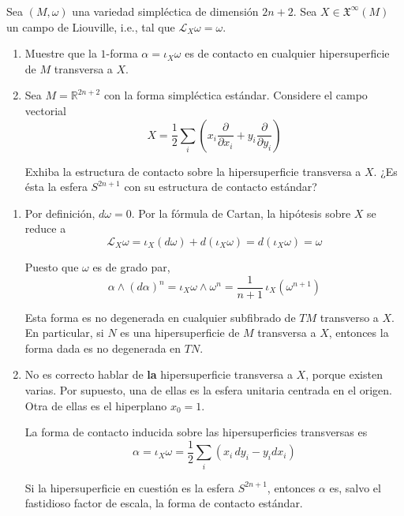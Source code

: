 \begin{problem}
Sea $(M, \omega)$ una variedad simpléctica de dimensión $2n+2$. Sea $X \in \mathfrak X^\infty(M)$ un campo de Liouville, i.e., tal que $\mathcal L_X \omega = \omega$.

\begin{enumerate}
    \item Muestre que la $1$-forma $\alpha = \iota_X \omega$ es de contacto en cualquier hipersuperficie de $M$ transversa a $X$.
    
    \item Sea $M = \mathbb R^{2n+2}$ con la forma simpléctica estándar. Considere el campo vectorial
    $$X = \frac 12 \sum_i \left( x_i \frac \partial {\partial x_i} + y_i \frac \partial {\partial y_i} \right)$$
    
    Exhiba la estructura de contacto sobre la hipersuperficie transversa a $X$. ¿Es ésta la esfera $S^{2n+1}$ con su estructura de contacto estándar?
\end{enumerate}
\end{problem}

\begin{solution}
\leavevmode
\begin{enumerate}
    \item Por definición, $d\omega = 0$. Por la fórmula de Cartan, la hipótesis sobre $X$ se reduce a
    $$\mathcal L_X \omega = \iota_X (d\omega) + d(\iota_X \omega) = d(\iota_X \omega) = \omega$$
    
    Puesto que $\omega$ es de grado par,
    $$\alpha \wedge (d\alpha)^n = \iota_X \omega \wedge \omega^n = \frac 1 {n+1} \, \iota_X (\omega^{n+1})$$
    
    Esta forma es no degenerada en cualquier subfibrado de $TM$ transverso a $X$. En particular, si $N$ es una hipersuperficie de $M$ transversa a $X$, entonces la forma dada es no degenerada en $TN.$
    
    \item No es correcto hablar de \textbf{la} hipersuperficie transversa a $X$, porque existen varias. Por supuesto, una de ellas es la esfera unitaria centrada en el origen. Otra de ellas es el hiperplano $x_0 = 1$.
    
    La forma de contacto inducida sobre las hipersuperficies transversas es
    $$\alpha = \iota_X \omega = \frac 12 \sum_i (x_i \, dy_i - y_i dx_i)$$
    
    Si la hipersuperficie en cuestión es la esfera $S^{2n+1}$, entonces $\alpha$ es, salvo el fastidioso factor de escala, la forma de contacto estándar.
\end{enumerate}
\end{solution}
